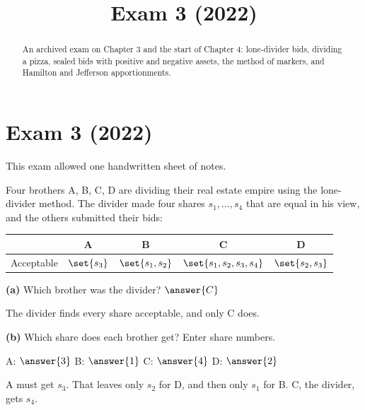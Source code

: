 \documentclass[12pt]{ximera}
\title{Exam 3 (2022)}
\begin{document}
\begin{abstract}
An archived exam on Chapter 3 and the start of Chapter 4: lone-divider bids, dividing a pizza, sealed bids with positive and negative assets, the method of markers, and Hamilton and Jefferson apportionments.
\end{abstract}
\maketitle

\section*{Exam 3 (2022)}

This exam allowed one handwritten sheet of notes.

\begin{problem}
Four brothers A, B, C, D are dividing their real estate empire using the lone-divider
method. The divider made four shares $s_1,\dots,s_4$ that are equal in his view, and the
others submitted their bids:
\begin{center}
\begin{tabular}{r|cccc}
 & A & B & C & D\\\hline
Acceptable & $\set{s_3}$ & $\set{s_1,s_2}$ & $\set{s_1,s_2,s_3,s_4}$ & $\set{s_2,s_3}$
\end{tabular}
\end{center}

\begin{prompt}
\textbf{(a)} Which brother was the divider? $\answer{C}$
\begin{feedback}
The divider finds every share acceptable, and only C does.
\end{feedback}
\end{prompt}

\begin{prompt}
\textbf{(b)} Which share does each brother get? Enter share numbers.

A: $\answer{3}$ \quad B: $\answer{1}$ \quad C: $\answer{4}$ \quad D: $\answer{2}$
\begin{feedback}
A must get $s_3$. That leaves only $s_2$ for D, and then only $s_1$ for B. C, the
divider, gets $s_4$.
\end{feedback}
\end{prompt}
\end{problem}
\end{document}
